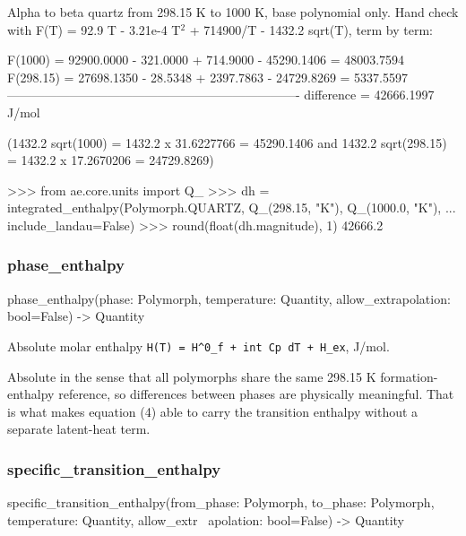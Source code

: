 \documentclass[10pt,a4paper,twoside]{report}
\begin{document}
Alpha to beta quartz from 298.15 K to 1000 K, base polynomial only. Hand check with F(T) = 92.9 T - 3.21e-4 T$^{2}$ + 714900/T - 1432.2 sqrt(T), term by term:

\begin{verbatimsmall}
F(1000)   = 92900.0000 - 321.0000 + 714.9000 - 45290.1406 = 48003.7594
F(298.15) = 27698.1350 -  28.5348 + 2397.7863 - 24729.8269 =  5337.5597
----------------------------------------------------------------------
difference                                                 = 42666.1997 J/mol
\end{verbatimsmall}

(1432.2 sqrt(1000) = 1432.2 x 31.6227766 = 45290.1406 and 1432.2 sqrt(298.15) = 1432.2 x 17.2670206 = 24729.8269)

\begin{doctestblock}
>>> from ae.core.units import Q_
>>> dh = integrated_enthalpy(Polymorph.QUARTZ, Q_(298.15, "K"), Q_(1000.0, "K"),
...                          include_landau=False)
>>> round(float(dh.magnitude), 1)
42666.2
\end{doctestblock}

\subsubsection*{phase\_enthalpy}

\begin{verbatimsmall}
phase_enthalpy(phase: Polymorph, temperature: Quantity, allow_extrapolation: bool=False) -> Quantity
\end{verbatimsmall}

Absolute molar enthalpy \texttt{H(T) = H\textasciicircum{}0\_f + int Cp dT + H\_ex}, J/mol.

Absolute in the sense that all polymorphs share the same 298.15 K formation-enthalpy reference, so differences between phases are physically meaningful. That is what makes equation (4) able to carry the transition enthalpy without a separate latent-heat term.

\subsubsection*{specific\_transition\_enthalpy}

\begin{verbatimsmall}
specific_transition_enthalpy(from_phase: Polymorph, to_phase: Polymorph, temperature: Quantity, allow_extr
    \ apolation: bool=False) -> Quantity
\end{verbatimsmall}
\end{document}
